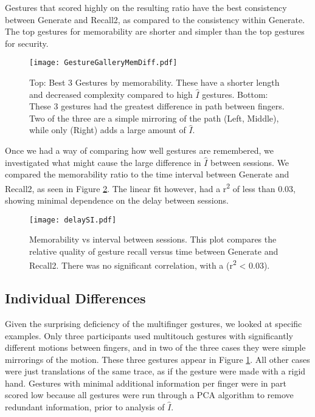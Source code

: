 \documentclass{sig-alternate-10pt}
\begin{document}
Gestures that scored highly on the resulting ratio have the best consistency between Generate and Recall2, as compared to the consistency within Generate. The top gestures for memorability are shorter and simpler than the top gestures for security.

\begin{figure}[!h]
\begin{center}
\texttt{[image: GestureGalleryMemDiff.pdf]}
\caption{Top: Best 3 Gestures by memorability. These have a shorter length and decreased complexity compared to high  $\hat{I}$ gestures. Bottom: These 3 gestures had the greatest difference in path between fingers. Two of the three are a simple mirroring of the path (Left, Middle), while only (Right) adds a large amount of  $\hat{I}$.}
\label{fig:MemoryRatio}
\label{fig:FDiff1}
\end{center}
\end{figure}









Once we had a way of comparing how well gestures are remembered, we investigated what might cause the large difference in $\hat{I}$ between sessions. We compared the memorability ratio to the time interval between Generate and Recall2, as seen in Figure \ref{fig:delaySI1}. The linear fit however, had a r\textsuperscript{2} of less than 0.03, showing minimal dependence on the delay between sessions.



\begin{figure}[!h]
\centering
\texttt{[image: delaySI.pdf]}
\caption{Memorability vs interval between sessions. This plot compares the relative quality of gesture recall versus time between Generate and Recall2. There was no significant correlation, with a  (r\textsuperscript{2} < 0.03).}
\label{fig:delaySI1}
\end{figure}








\subsection{Individual Differences}






  Given the surprising deficiency of the multifinger gestures, we looked at specific examples. Only three participants used multitouch gestures with significantly different motions between fingers, and in two of the three cases they were simple mirrorings of the motion. These three gestures appear in Figure \ref{fig:FDiff1}. All other cases were just translations of the same trace, as if the gesture were made with a rigid hand. Gestures with minimal additional information per finger were in part scored low because all gestures were run through a PCA algorithm to remove redundant information, prior to analysis of $\hat{I}$.
\end{document}
